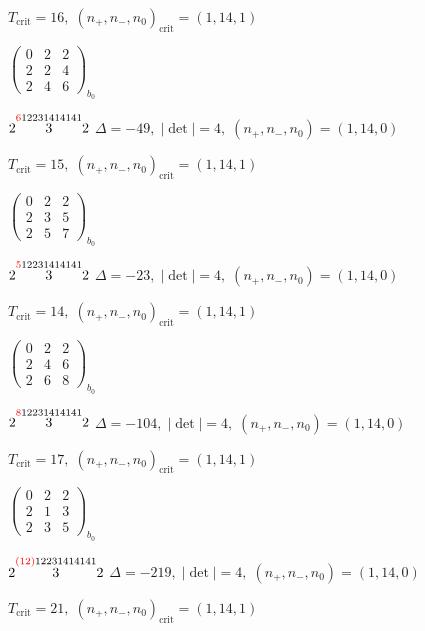 \documentclass[10pt]{article}
\begin{document}
\hspace{1em}$T_{\text{crit}}=16,\; (n_+,n_-,n_0)_{\text{crit}}=(1,14,1)$

\hspace{2em}$\left(\begin{smallmatrix}0 & 2 & 2 \\ 2 & 2 & 4 \\ 2 & 4 & 6\end{smallmatrix}\right)_{\!b_0}$

$2\overset{\textcolor{red}{6}12231414141}{3}2$ \quad $\Delta=-49,\; |\det|=4,\; (n_+,n_-,n_0)=(1,14,0)$

\hspace{1em}$T_{\text{crit}}=15,\; (n_+,n_-,n_0)_{\text{crit}}=(1,14,1)$

\hspace{2em}$\left(\begin{smallmatrix}0 & 2 & 2 \\ 2 & 3 & 5 \\ 2 & 5 & 7\end{smallmatrix}\right)_{\!b_0}$

$2\overset{\textcolor{red}{5}12231414141}{3}2$ \quad $\Delta=-23,\; |\det|=4,\; (n_+,n_-,n_0)=(1,14,0)$

\hspace{1em}$T_{\text{crit}}=14,\; (n_+,n_-,n_0)_{\text{crit}}=(1,14,1)$

\hspace{2em}$\left(\begin{smallmatrix}0 & 2 & 2 \\ 2 & 4 & 6 \\ 2 & 6 & 8\end{smallmatrix}\right)_{\!b_0}$

$2\overset{\textcolor{red}{8}12231414141}{3}2$ \quad $\Delta=-104,\; |\det|=4,\; (n_+,n_-,n_0)=(1,14,0)$

\hspace{1em}$T_{\text{crit}}=17,\; (n_+,n_-,n_0)_{\text{crit}}=(1,14,1)$

\hspace{2em}$\left(\begin{smallmatrix}0 & 2 & 2 \\ 2 & 1 & 3 \\ 2 & 3 & 5\end{smallmatrix}\right)_{\!b_0}$

$2\overset{\textcolor{red}{(12)}12231414141}{3}2$ \quad $\Delta=-219,\; |\det|=4,\; (n_+,n_-,n_0)=(1,14,0)$

\hspace{1em}$T_{\text{crit}}=21,\; (n_+,n_-,n_0)_{\text{crit}}=(1,14,1)$
\end{document}
